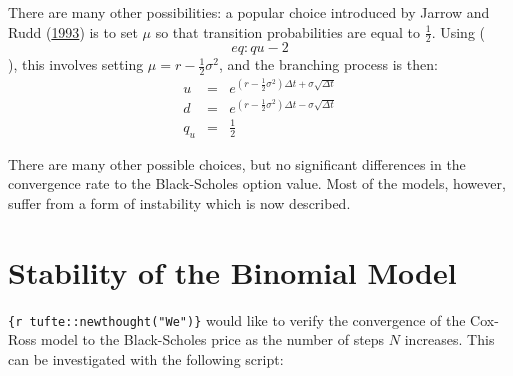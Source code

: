 \documentclass[justified]{tufte-book}
\begin{document}
There are many other possibilities: a popular choice introduced by
Jarrow and Rudd (\protect\hyperlink{ref-R.Jarrow1993}{1993}) is to set \(\mu\) so that transition probabilities are equal
to \(\frac{1}{2}\). Using (\[eq:qu-2\]), this involves setting
\(\mu=r-\frac{1}{2}\sigma^2\), and the branching process is then:
\[\begin{aligned}
 u &=& e^{(r-\frac{1}{2} \sigma^2)\Delta t + \sigma \sqrt{\Delta t}} \\
d &=& e^{(r-\frac{1}{2} \sigma^2)\Delta t -\sigma \sqrt{\Delta t}} \\
q_u &=& \frac{1}{2}\end{aligned}\]

There are many other possible choices, but no significant differences in
the convergence rate to the Black-Scholes option value. Most of the
models, however, suffer from a form of instability which is now
described.

\hypertarget{stability-of-the-binomial-model}{%
\chapter{Stability of the Binomial Model}\label{stability-of-the-binomial-model}}

\texttt{\{r\ tufte::newthought("We")\}} would like to verify the convergence of the Cox-Ross model to the
Black-Scholes price as the number of steps \(N\) increases. This can be
investigated with the following script:
\end{document}
